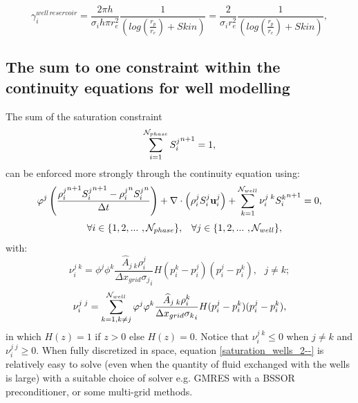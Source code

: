 \begin{equation}
\gamma_{i}^{well\, reservoir}
=\frac{2 \pi h}{\sigma_i h\pi r_e^2} \frac{1}{ ( log(\frac{r_p}{r_e}) + Skin)}
=\frac{2 }{\sigma_i r_e^2} \frac{1}{ ( log(\frac{r_p}{r_e}) + Skin)}
 ,
\label{saturation_wells_15-well10reservoir-cyl-skin}
\end{equation}



\subsection{The sum to one constraint within the continuity equations for well modelling} 
\label{Continuity equation for well modelling} 
The sum of the saturation constraint
\begin{equation}
\sum\limits_{i=1}^{{\cal N}_{phase}} 
{S_i^{j}}^{n+1}
= 1, 
\label{saturation_wells_3c--}
\end{equation}
can be enforced more strongly through the continuity equation using:
\begin{equation}
\phi^j \displaystyle \left( \frac{  
 {\rho_{i}^{j}}^{n+1} {S_i^{j}}^{n+1} - {\rho_{i}^{j}}^n {S_i^{j}}^n
}{\Delta t} \right) + \nabla\cdot\left(\rho_{i}^{j}S_i^{j}\mathbf{u}_i^{j}\right) + \sum_{k=1}^{{\cal N}_{well}} \nu_{i}^{j\;k}  {S_i^{k}}^{n+1}= 0, 
\label{saturation_wells_2--}
\end{equation}
\begin{equation}
~~~ \forall i \in\{ 1,2,...~ , {\cal N}_{phase}\}, \;\;\; 
\forall j \in\{ 1,2,...~ , {\cal N}_{well} \}, 
\label{saturation_wells_2--all}
\end{equation}
with:
\begin{equation}
\nu_{i}^{j\;k} = \phi^j \phi^k \frac{ \widehat A_{j\;k}  \rho_i^{j}  }{{{\Delta x}_{grid}\sigma_{j}}_i}  H(p_{i}^{k}-p_{i}^{j}) (p_{i}^{j}-p_{i}^{k}), 
~~~j\neq k ;  
\label{saturation_wells_H1}
\end{equation}
\begin{equation}
\nu_{i}^{j\;j} = \sum_{k=1, k\neq j}^{{\cal N}_{well}} \phi^j \phi^k \frac{ \widehat A_{j\;k}  \rho_i^{k}  }{{{\Delta x}_{grid}\sigma_{k}}_i} H(p_{i}^{j}-p_{i}^{k}) (p_{i}^{j}-p_{i}^{k}), 
\label{saturation_wells_H2}
\end{equation}
in which $H(z)=1$ if $z>0$ else $H(z)=0$.  
Notice that $\nu_{i}^{j\;k}\le 0$ when $j\neq k$ and $\nu_{i}^{j\;j}\ge 0$.  
When fully discretized in space, equation \ref{saturation_wells_2--} is relatively easy to solve (even when the quantity 
of fluid exchanged with the wells is large) with a suitable choice of solver e.g. GMRES with a 
BSSOR preconditioner, or some multi-grid methods. 

